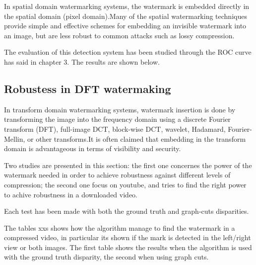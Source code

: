 In spatial domain watermarking systems, the watermark is embedded directly in the spatial domain (pixel domain).\newline  Many of the spatial watermarking techniques provide simple and effective schemes for embedding an invisible watermark into an image, but are less robust to common attacks such as lossy compression.

The evaluation of this detection system has been studied through the ROC curve has said in chapter 3. The results are shown below.

\subsection{Robustess in DFT watermaking}

In transform domain watermarking systems, watermark insertion is done by transforming the image into the frequency domain using a discrete Fourier transform (DFT), full-image DCT, block-wise DCT, wavelet, Hadamard, Fourier-Mellin, or other transforms.\newline  It is often claimed that embedding in the transform domain is advantageous in terms of visibility and security.\newline 

Two studies are presented in this section: the first one concernes the power of the watermark needed in order to achieve robustness against different levels of compression; the second one focus on youtube, and tries to find the right power to achive robustness in a downloaded video.\newline 

Each test has been made with both the ground truth and graph-cuts disparities.\newline 

The tables xxs shows how the algorithm manage to find the watermark in a compressed video, in particular its shown if the mark is detected in the left/right view or both images. The first table shows the results when the algorithm is used with the ground truth disparity, the second when using graph cuts.


